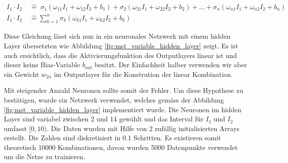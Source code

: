 \begin{align}
I_{1} \cdot I_{2} \; & \hat{=} \; \sigma_{1} \left( \omega_{11} I_1 + \omega_{12} I_2 + b_{1} \right) + \sigma_{2} \left( \omega_{21} I_1 + \omega_{22} I_2 + b_{2}  \right) + \dots  + \sigma_{n} \left( \omega_{n1} I_1 + \omega_{n2} I_2 + b_{n} \right) \\
I_{1} \cdot I_{2} \; & \hat{=} \sum_{k=1}^{n} \sigma_{k} \left( \omega_{k1} I_1 + \omega_{k2} I_2 + b_{k} \right)
\label{eq:mst_traivial_sum}
\end{align}
 
Diese Gleichung lässt sich nun in ein neuronales Netzwerk mit einem hidden Layer übersetzten wie Abbildung \ref{fig:mst_variable_hidden_layer} zeigt. Es ist auch ersichtlich, dass die Aktivierungsfunktion des Outputlayers linear ist und dieser keine Bias-Variable $b_{out}$ besitzt. Der Einfachheit halber verwenden wir aber ein Gewicht $w_{2n}$ im Outputlayer für die Konstrution der linear Kombination.

Mit steigender Anzahl Neuronen sollte somit der Fehler. Um diese Hypothese zu bestätigen, wurde ein Netzwerk verwendet, welches gemäss der Abbildung \ref{fig:mst_variable_hidden_layer} implementiert wurde. Die Neuronen im hidden Layer sind variabel zwischen 2 und 14 gewählt und das Interval für $I_1$ und $I_2$ umfasst $[0, 10)$. Die Daten wurden mit Hilfe von 2 zufällig initialisierten Arrays erstellt. Die Zahlen sind diskretisiert in $0.1$ Schritten. Es existieren somit theoretisch 10000 Kombinationen, davon wurden 5000 Datenpunkte verwendet um die Netze zu trainieren.

